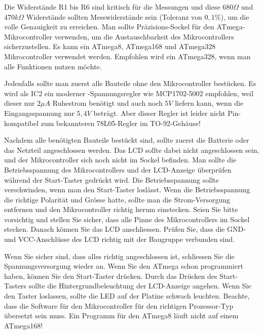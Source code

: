 Die Widerstände R1 bis R6 sind kritisch für die Messungen und diese \(680\Omega\) und
\(470k\Omega\) Widerstände sollten Messwiderstände sein (Toleranz von \(0,1\%\)), um 
die volle Genauigkeit zu erreichen.
Man sollte Präzisions-Sockel für den ATmega-Mikrocontroller verwenden, um
die Austauschbarkeit des Mikrocontrollers sicherzustellen.
Es kann ein ATmega8, ATmega168 und ATmega328 Mikrocontroller verwendet werden.
Empfohlen wird ein ATmega328, wenn man alle Funktionen nutzen möchte.

Jedenfalls sollte man zuerst alle Bauteile ohne den Mikrocontroller bestücken.
Es wird als IC2 ein moderner -Spannungsregler wie MCP1702-5002 empfohlen, weil
dieser nur \(2\mu A\) Ruhestrom benötigt und auch noch \(5V\) liefern kann, 
 wenn die Eingangsspannung nur \(5,4V\) beträgt.
Aber dieser Regler ist leider nicht Pin-kompatibel zum bekannteren 78L05-Regler im TO-92-Gehäuse!

Nachdem alle benötigten Bauteile bestückt sind, sollte zuerst die Batterie
oder das Netzteil angeschlossen werden. Das LCD sollte dabei nicht angeschlossen sein, und der Mikrocontroller sich noch nicht im Sockel befinden.
Man sollte die Betriebsspannung des Mikrocontrollers und der LCD-Anzeige
überprüfen während der Start-Taster gedrückt wird.
Die Betriebsspannung sollte verschwinden, wenn man den Start-Taster loslässt.
Wenn die Betriebsspannung die richtige Polarität und Grösse hatte,
sollte man die Strom-Versorgung entfernen und den Mikrocontroller 
richtig herum einstecken. Seien Sie bitte vorsichtig und stellen Sie sicher,
dass alle Pinne des Mikrocontrollers im Sockel stecken.
Danach können Sie das LCD anschliessen. Prüfen Sie, dass die GND- und VCC-Anschlüsse des LCD richtig mit der Baugruppe verbunden sind.

Wenn Sie sicher sind, dass alles richtig angeschlossen ist, schliessen Sie
die Spannungsversorgung wieder an.
Wenn Sie den ATmega schon programmiert haben, können Sie den Start-Taster
drücken.
Durch das Drücken des Start-Tasters sollte die Hintergrundbeleuchtung
der LCD-Anzeige angehen.
Wenn Sie den Taster loslassen, sollte die LED auf der Platine schwach leuchten.
Beachte, dass die Software für den Mikrocontroller für den richtigen
Prozessor-Typ übersetzt sein muss. Ein Programm für den ATmega8 läuft
nicht auf einem ATmega168!

